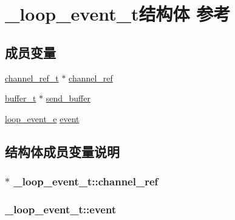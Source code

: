 \hypertarget{a00029}{}\section{\+\_\+loop\+\_\+event\+\_\+t结构体 参考}
\label{a00029}
\subsection*{成员变量}
\begin{DoxyCompactItemize}
\item 
\hyperlink{a00050_a151271c9d188ef28d4d24bb81dcc1263_a151271c9d188ef28d4d24bb81dcc1263}{channel\+\_\+ref\+\_\+t} $\ast$ \hyperlink{a00029_a004e7698edee7fd1b94b08f4be4f0ad1_a004e7698edee7fd1b94b08f4be4f0ad1}{channel\+\_\+ref}
\item 
\hyperlink{a00050_aad99a77d28bd81d3d36d0ea569c9482d_aad99a77d28bd81d3d36d0ea569c9482d}{buffer\+\_\+t} $\ast$ \hyperlink{a00029_a95cfa23b9392db798b8fbcc41f094614_a95cfa23b9392db798b8fbcc41f094614}{send\+\_\+buffer}
\item 
\hyperlink{a00068_ab92fe4e788615cfd56530167651a8ff4_ab92fe4e788615cfd56530167651a8ff4}{loop\+\_\+event\+\_\+e} \hyperlink{a00029_a76dd6f9dca6bec4527fbe55184812a70_a76dd6f9dca6bec4527fbe55184812a70}{event}
\end{DoxyCompactItemize}


\subsection{结构体成员变量说明}
\hypertarget{a00029_a004e7698edee7fd1b94b08f4be4f0ad1_a004e7698edee7fd1b94b08f4be4f0ad1}{}
\subsubsection[{channel\+\_\+ref}]{$\ast$ \+\_\+loop\+\_\+event\+\_\+t\+::channel\+\_\+ref}\label{a00029_a004e7698edee7fd1b94b08f4be4f0ad1_a004e7698edee7fd1b94b08f4be4f0ad1}
\hypertarget{a00029_a76dd6f9dca6bec4527fbe55184812a70_a76dd6f9dca6bec4527fbe55184812a70}{}
\subsubsection[{event}]{ \+\_\+loop\+\_\+event\+\_\+t\+::event}\label{a00029_a76dd6f9dca6bec4527fbe55184812a70_a76dd6f9dca6bec4527fbe55184812a70}
\hypertarget{a00029_a95cfa23b9392db798b8fbcc41f094614_a95cfa23b9392db798b8fbcc41f094614}{}

